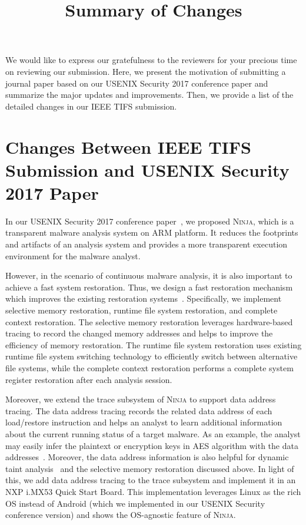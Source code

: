 \documentclass[journal,12pt,onecolumn,draftclsnofoot,]{IEEEtran}
\newcommand{\TheName}{\textsc{Ninja}}
\begin{document}
\title{Summary of Changes}
\maketitle


We would like to express our gratefulness to the reviewers for your 
precious time on reviewing our submission. Here, we present the
motivation of submitting a journal paper based on our USENIX
Security 2017 conference paper and summarize the major updates
and improvements. Then, we provide a list of the detailed changes
in our IEEE TIFS submission.

\section{Changes Between IEEE TIFS Submission and USENIX Security 2017 Paper}

In our USENIX Security 2017 conference paper~\cite{ninja:usenix17}, we proposed
\TheName{}, which is a transparent malware analysis system on ARM platform.
It reduces the footprints and artifacts of an analysis system and provides a
more transparent execution environment for the malware analyst. 

However, in the scenario of continuous malware analysis, it is also important
to achieve a fast system restoration. Thus, we design a fast
restoration mechanism which improves the existing restoration
systems~\cite{barebox:acsac11,barecloud:usenix14,malt:sp15,bolt:acsac17}. 
Specifically, we implement selective memory restoration, runtime file system
restoration, and complete context restoration. The selective memory restoration
leverages hardware-based tracing to record the changed memory addresses and
helps to improve the efficiency of memory restoration. The runtime file system
restoration uses existing runtime file system switching technology to efficiently switch
between alternative file systems, while the complete context restoration performs
a complete system register restoration after each analysis session.

Moreover, we extend the trace subsystem of \TheName{} to support data address tracing.
The data address tracing records the related data address of each load/restore
instruction and helps an analyst to learn additional information
about the current running status of a target malware. As an example, 
the analyst may easily infer the plaintext or encryption keys in AES algorithm
with the data addresses~\cite{armageddon:usenix16}. Moreover, the data address 
information is also helpful for dynamic taint analysis~\cite{sokda:sp10} and 
the selective memory restoration discussed above.
In light of this, we add data address tracing to the trace subsystem and implement
it in an NXP i.MX53 Quick Start Board. This implementation
leverages Linux as the rich OS instead of Android (which we implemented in our USENIX Security conference version) and shows the OS-agnostic feature of \TheName{}.
\end{document}
